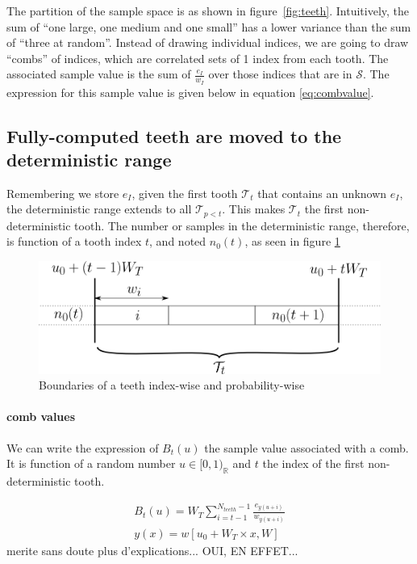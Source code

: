 \documentclass[./thesis.tex]{subfiles}
\begin{document}
The partition of the sample space is as shown in figure~\ref{fig:teeth}.
Intuitively, the sum of ``one large, one medium and one small'' has a lower variance than the sum of ``three at random''. Instead of drawing individual indices, we are going to draw ``combs'' of indices, which are correlated sets of 1 index from each tooth. The associated sample value is the sum of $\frac{e_I}{w_I}$ over those indices that are in $\mathcal{S}$.  The expression for this sample value is given below in equation \ref{eq:combvalue}.

\subsection{Fully-computed teeth are moved to the deterministic range}

Remembering we store $e_I$, given the first tooth $\mathcal{T}_t$ that contains an unknown $e_I$, the deterministic range extends to all $\mathcal{T}_{p<t}$. This makes $\mathcal{T}_t$ the first non-deterministic tooth.
The number or samples in the deterministic range, therefore, is function of a tooth index $t$, and noted $n_0(t)$, as seen in figure \ref{fig:boundaries_teeth}

\begin{figure}[h!]
	\begin{center}
		\includegraphics[width=0.8\columnwidth]{figures/pt2/tooththreshold}
	\end{center}
	\caption{Boundaries of a teeth index-wise and probability-wise}
	\label{fig:boundaries_teeth}
\end{figure}


\paragraph{comb values}

We can write the expression of $B_t(u)$ the sample value associated with a comb. It is function of a random number $u \in [0,1)_\mathbb{R}$ and $t$ the index of the first non-deterministic tooth.

\begin{align}
\label{eq:combvalue}
B_t(u) = W_T \sum_{i=t-1}^{N_{teeth}-1} \frac{e_{y(u+i)}}{w_{y(u+i)}} \\
y(x)=w[u_0+ W_T \times x, W]
\end{align}
\alert{merite sans doute plus d'explications... OUI, EN EFFET...}
\end{document}

